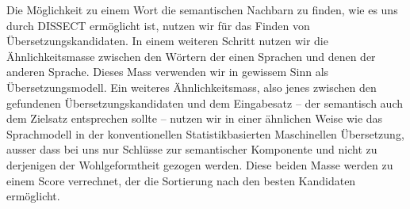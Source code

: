 \documentclass[11pt,twoside,openright]{mpreport}
\begin{document}
Die Möglichkeit zu einem Wort die semantischen Nachbarn zu finden, wie es uns durch DISSECT ermöglicht ist, nutzen wir für das Finden von Übersetzungskandidaten. In einem weiteren Schritt nutzen wir die Ähnlichkeitsmasse zwischen den Wörtern der einen Sprachen und denen der anderen Sprache. Dieses Mass verwenden wir in gewissem Sinn als Übersetzungsmodell.
Ein weiteres Ähnlichkeitsmass, also jenes zwischen den gefundenen Übersetzungskandidaten und dem Eingabesatz -- der semantisch auch dem Zielsatz entsprechen sollte -- nutzen wir in einer ähnlichen Weise wie das Sprachmodell in der konventionellen Statistikbasierten Maschinellen Übersetzung, ausser dass bei uns nur Schlüsse zur semantischer Komponente und nicht zu derjenigen der Wohlgeformtheit gezogen werden. Diese beiden Masse werden zu einem Score verrechnet, der die Sortierung nach den besten Kandidaten ermöglicht.


\end{document}
